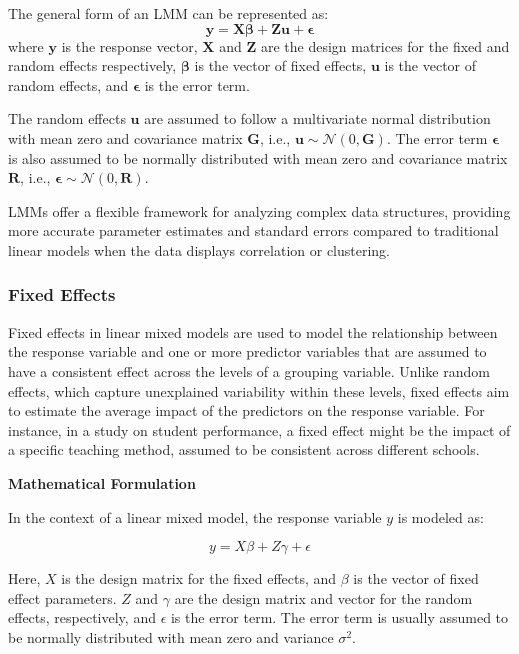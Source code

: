 \documentclass[12pt, twoside,hidelinks]{article}
\theoremstyle{definition}
\numberwithin{equation}{section}
\begin{document}
The general form of an LMM can be represented as:
\[
\mathbf{y} = \mathbf{X}\boldsymbol{\beta} + \mathbf{Z}\boldsymbol{u} + \boldsymbol{\epsilon}
\]
where \( \mathbf{y} \) is the response vector, \( \mathbf{X} \) and \( \mathbf{Z} \) are the design matrices for the fixed and random effects respectively, \( \boldsymbol{\beta} \) is the vector of fixed effects, \( \boldsymbol{u} \) is the vector of random effects, and \( \boldsymbol{\epsilon} \) is the error term.

The random effects \( \boldsymbol{u} \) are assumed to follow a multivariate normal distribution with mean zero and covariance matrix \( \mathbf{G} \), i.e., \( \boldsymbol{u} \sim \mathcal{N}(0, \mathbf{G}) \). The error term \( \boldsymbol{\epsilon} \) is also assumed to be normally distributed with mean zero and covariance matrix \( \mathbf{R} \), i.e., \( \boldsymbol{\epsilon} \sim \mathcal{N}(0, \mathbf{R}) \).


LMMs offer a flexible framework for analyzing complex data structures, providing more accurate parameter estimates and standard errors compared to traditional linear models when the data displays correlation or clustering.

\subsubsection{Fixed Effects}

Fixed effects in linear mixed models are used to model the relationship between the response variable and one or more predictor variables that are assumed to have a consistent effect across the levels of a grouping variable. Unlike random effects, which capture unexplained variability within these levels, fixed effects aim to estimate the average impact of the predictors on the response variable. For instance, in a study on student performance, a fixed effect might be the impact of a specific teaching method, assumed to be consistent across different schools.
\newline

\textbf{Mathematical Formulation}
\newline

In the context of a linear mixed model, the response variable \( y \) is modeled as:

\[
y = X\beta + Z\gamma + \epsilon
\]

Here, \( X \) is the design matrix for the fixed effects, and \( \beta \) is the vector of fixed effect parameters. \( Z \) and \( \gamma \) are the design matrix and vector for the random effects, respectively, and \( \epsilon \) is the error term. The error term is usually assumed to be normally distributed with mean zero and variance \( \sigma^2 \).
\end{document}
